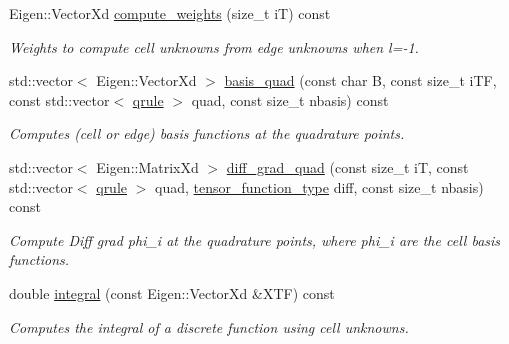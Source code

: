 \begin{DoxyCompactItemize}
\mbox{\label{classHCore2D_1_1HybridCore_a06825c5d156026d465a2798389aa952b}} 
Eigen\+::\+Vector\+Xd \hyperlink{classHCore2D_1_1HybridCore_a06825c5d156026d465a2798389aa952b}{compute\+\_\+weights} (size\+\_\+t iT) const
\begin{DoxyCompactList}\small\item\em Weights to compute cell unknowns from edge unknowns when l=-\/1. \end{DoxyCompactList}\item 
std\+::vector$<$ Eigen\+::\+Vector\+Xd $>$ \hyperlink{classHCore2D_1_1HybridCore_adc7afe2ff1f5a56ebe48b407bdf08d6e}{basis\+\_\+quad} (const char B, const size\+\_\+t i\+TF, const std\+::vector$<$ \hyperlink{structHCore2D_1_1HybridCore_1_1qrule}{qrule} $>$ quad, const size\+\_\+t nbasis) const
\begin{DoxyCompactList}\small\item\em Computes (cell or edge) basis functions at the quadrature points. \end{DoxyCompactList}\item 
std\+::vector$<$ Eigen\+::\+Matrix\+Xd $>$ \hyperlink{classHCore2D_1_1HybridCore_ae0349043d1db479a70f7827cd9181657}{diff\+\_\+grad\+\_\+quad} (const size\+\_\+t iT, const std\+::vector$<$ \hyperlink{structHCore2D_1_1HybridCore_1_1qrule}{qrule} $>$ quad, \hyperlink{classHCore2D_1_1HybridCore_acf40d06e50a33dbb42cc4e1e3b0529b5}{tensor\+\_\+function\+\_\+type} diff, const size\+\_\+t nbasis) const
\begin{DoxyCompactList}\small\item\em Compute \textquotesingle{}Diff grad phi\+\_\+i\textquotesingle{} at the quadrature points, where phi\+\_\+i are the cell basis functions. \end{DoxyCompactList}\item 
\mbox{\label{classHCore2D_1_1HybridCore_aed85cdfc0bb96c65ce201528366e92f8}} 
double \hyperlink{classHCore2D_1_1HybridCore_aed85cdfc0bb96c65ce201528366e92f8}{integral} (const Eigen\+::\+Vector\+Xd \&X\+TF) const
\begin{DoxyCompactList}\small\item\em Computes the integral of a discrete function using cell unknowns. \end{DoxyCompactList}\item 
\mbox{\label{classHCore2D_1_1HybridCore_a58dd478934c1f5b65ae8b7df31e8ead4}} 

\end{DoxyCompactItemize}
